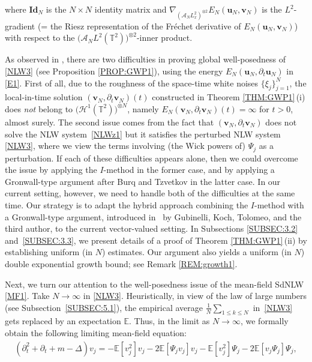 \documentclass[letterpaper, 11pt,  reqno]{amsart}
\newcommand{\1}{\hspace{0.5mm}\text{I}\hspace{0.2mm}}
\newcommand{\noi}{\noindent}
\newcommand{\T}{\mathbb{T}}
\newcommand{\E}{\mathbb{E}}
\renewcommand{\H}{\mathcal{H}}
\newcommand{\Id}{\textbf{Id}}
\newcommand{\Dl}{\Delta}
\newcommand{\dt}{\partial_t}
\newcommand{\nb}{\nabla}
\newcommand{\A}{\mathcal{A}}
\newcommand{\vv}{\mathbf{v}}
\newcommand{\uu}{\mathbf{u}}
\numberwithin{equation}{section}
\numberwithin{theorem}{section}
\begin{document}
\noi
where $\Id_N$ is the $N\times N$ identity matrix
and 
$\nb_{(\A_N L^2_x)^{\otimes 2}} E_N(\uu_N, \vv_N)$ is the $L^2$-gradient
(= the Riesz representation of the Fr\'echet derivative of 
$E_N(\uu_N, \vv_N)$)
with respect to the $\big(\A_N L^2(\T^2)\big)^{\otimes 2}$-inner product.

As observed in \cite{GKOT}, 
there are two difficulties
in proving global well-posedness
of \eqref{NLW3}
(see Proposition \ref{PROP:GWP1}), 
using the energy 
$E_N (\uu_N, \dt \uu_N) $ in \eqref{E1}.
First of all, 
due to the roughness of the space-time white noises $\{\xi_j \}_{j = 1}^N$, 
the local-in-time solution $(\vv_N, \dt \vv_N)(t)$
constructed in Theorem \ref{THM:GWP1}\,(i)
does {\it not} belong to 
$\big(\H^1 (\T^2)\big)^{\otimes N}$, 
namely
$E_N (\vv_N, \dt \vv_N) (t) = \infty$
for $t > 0$, almost surely.
The second issue comes from the fact that 
$(\vv_N, \dt \vv_N)$
does not solve the NLW system~\eqref{NLWz1}
but it satisfies
the perturbed NLW system \eqref{NLW3}, 
where we view the terms involving (the Wick powers of) $\Psi_j$
as a perturbation.
If each of these difficulties
appears alone, then we could overcome the issue
by applying the $I$-method \cite{CKSTT1} in the former case, 
and by applying a Gronwall-type argument after
Burq and Tzvetkov \cite{BT2} in the latter case.
In our current setting, however, 
we need to handle both of the difficulties at the same time.
Our strategy is to adapt the hybrid approach
combining the $I$-method with a Gronwall-type argument, 
introduced in~\cite{GKOT}
by Gubinelli, Koch, Tolomeo, and the third author, 
to the current vector-valued setting.
In Subsections \ref{SUBSEC:3.2}
and~\ref{SUBSEC:3.3},
we present details of a proof of Theorem \ref{THM:GWP1}\,(ii)
by establishing uniform (in $N$) estimates.
Our argument also yields
a uniform (in $N$) double exponential growth bound; see Remark \ref{REM:growth1}.




\medskip


Next, we turn our attention to the well-posedness
issue of the mean-field SdNLW \eqref{MF1}.
Take $N \to \infty$ in \eqref{NLW3}.
Heuristically, in view of the law of large numbers
(see Subsection~\ref{SUBSEC:5.1}), 
 the empirical average 
$\frac 1N \sum_{1 \leq k \leq N}$ in~\eqref{NLW3}
gets replaced by 
an expectation $\E$.
Thus, in the limit as $N \to \infty$, 
we formally obtain the following limiting mean-field equation:
\begin{align}
(\dt^2 + \dt + m - \Dl) v_j = 
- \E [ v_j^2 ] v_j
- 2 \E [ \Psi_j v_j ] v_j 
- \E [ v_j^2 ] \Psi_j 
- 2 \E [ v_j \Psi_j  ] \Psi_j , 
\label{NLW5}
\end{align}
\end{document}
